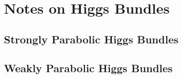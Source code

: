 \section{Notes on Higgs Bundles}

\subsection{Strongly Parabolic Higgs Bundles}

\subsection{Weakly Parabolic Higgs Bundles}

